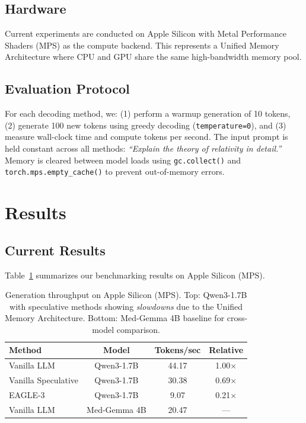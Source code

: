 \documentclass[11pt]{article}
\begin{document}
\subsection{Hardware}
Current experiments are conducted on Apple Silicon with Metal Performance Shaders (MPS) as the compute backend. This represents a Unified Memory Architecture where CPU and GPU share the same high-bandwidth memory pool.

\subsection{Evaluation Protocol}
For each decoding method, we: (1) perform a warmup generation of 10 tokens, (2) generate 100 new tokens using greedy decoding (\texttt{temperature=0}), and (3) measure wall-clock time and compute tokens per second. The input prompt is held constant across all methods: \textit{``Explain the theory of relativity in detail.''} Memory is cleared between model loads using \texttt{gc.collect()} and \texttt{torch.mps.empty\_cache()} to prevent out-of-memory errors.

\section{Results}

\subsection{Current Results}

Table~\ref{tab:results} summarizes our benchmarking results on Apple Silicon (MPS).

\begin{table}[h]
\centering
\begin{tabular}{lccc}
\toprule
\textbf{Method} & \textbf{Model} & \textbf{Tokens/sec} & \textbf{Relative} \\
\midrule
Vanilla LLM & Qwen3-1.7B & 44.17 & 1.00$\times$ \\
Vanilla Speculative & Qwen3-1.7B & 30.38 & 0.69$\times$ \\
EAGLE-3 & Qwen3-1.7B & 9.07 & 0.21$\times$ \\
\midrule
Vanilla LLM & Med-Gemma 4B & 20.47 & --- \\
\bottomrule
\end{tabular}
\caption{Generation throughput on Apple Silicon (MPS). Top: Qwen3-1.7B with speculative methods showing \textit{slowdowns} due to the Unified Memory Architecture. Bottom: Med-Gemma 4B baseline for cross-model comparison.}
\label{tab:results}
\end{table}
\end{document}
